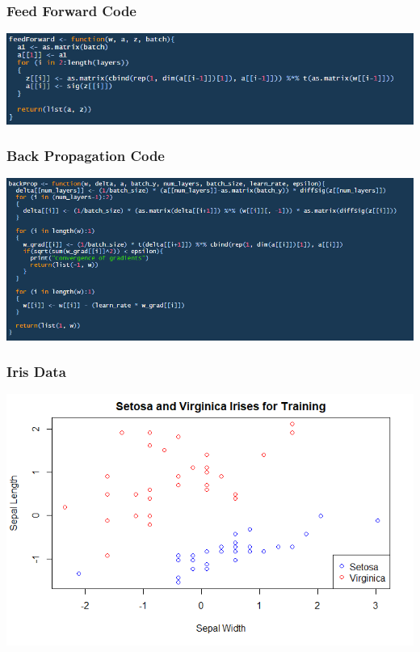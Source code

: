 \documentclass{beamer}
\begin{document}
\begin{frame}
    \frametitle{Feed Forward Code}

    \centerline{\includegraphics[scale = .5]{feedforward.png}}

\end{frame}

\begin{frame}
    \frametitle{Back Propagation Code}

    \centerline{\includegraphics[scale = .43]{backprop.png}}

\end{frame}

\begin{frame}
    \frametitle{Iris Data}

    \centerline{\includegraphics[scale = .5]{irisgraph.png}}

\end{frame}
\end{document}

